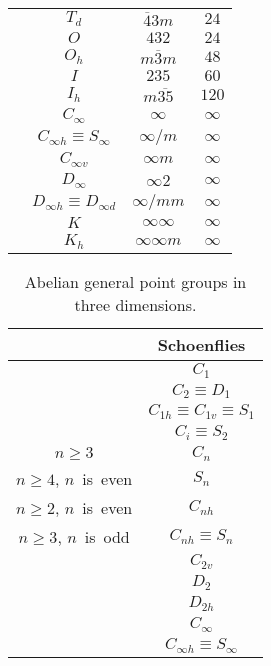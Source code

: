 \begin{table}[tb]
\begin{tabular}{cccc}
    & $T_{d}$ & $\overline{4}3m$ & $24$ \\
    & $O$     & $432$            & $24$ \\
    & $O_{h}$ & $m\overline{3}m$ & $48$ \\
    & $I$     & $235$            & $60$ \\
    & $I_{h}$ & $m\overline{35}$ & $120$ \\
    \hline
    & $C_{\infty}$                       & $\infty$          & $\infty$ \\
    & $C_{\infty h} \equiv S_{\infty}$   & $\infty / m$      & $\infty$ \\
    & $C_{\infty v}$                     & $\infty m$        & $\infty$ \\
    & $D_{\infty}$                       & $\infty 2$        & $\infty$ \\
    & $D_{\infty h} \equiv D_{\infty d}$ & $\infty / mm$     & $\infty$\\
    & $K$                                & $\infty \infty$   & $\infty$\\
    & $K_{h}$                            & $\infty \infty m$ & $\infty$\\
    \hline \hline
  \end{tabular}
\end{table}

\begin{table}[tb]
  \centering
  \caption{
    Abelian general point groups in three dimensions.
  }
  \label{tab:abelian_point_groups}
  \begin{tabular}{cc}
    \hline \hline
    & Schoenflies \\
    \hline
    & $C_{1}$                             \\
    & $C_{2} \equiv D_{1}$                \\
    & $C_{1h} \equiv C_{1v} \equiv S_{1}$ \\
    & $C_{i} \equiv S_{2}$                \\
    \hline
    $n \geq 3$                     & $C_{n}$               \\
    $n \geq 4$, \mbox{$n$ is even} & $S_{n}$               \\
    $n \geq 2$, \mbox{$n$ is even} & $C_{nh}$              \\
    $n \geq 3$, \mbox{$n$ is odd}  & $C_{nh} \equiv S_{n}$ \\
                                   & $C_{2v}$              \\
    \hline
    & $D_{2}$  \\
    & $D_{2h}$ \\
    \hline
    & $C_{\infty}$                     \\
    & $C_{\infty h} \equiv S_{\infty}$ \\
    \hline \hline
  \end{tabular}
\end{table}


